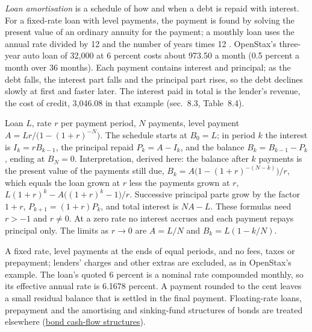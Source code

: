 \begin{qfmethod}\label{meth:loan-amortisation}
 \emph{Loan amortisation} is a schedule of how and when a debt is repaid with interest. For a fixed-rate loan with level payments, the payment is found by solving the present value of an ordinary annuity for the payment; a monthly loan uses the annual rate divided by 12 and the number of years times 12 \citep[sec.~8.3]{principles-of-finance-2026}. OpenStax's three-year auto loan of 32{,}000 at 6 percent costs about 973.50 a month (0.5 percent a month over 36 months). Each payment contains interest and principal; as the debt falls, the interest part falls and the principal part rises, so the debt declines slowly at first and faster later. The interest paid in total is the lender's revenue, the cost of credit, 3{,}046.08 in that example (sec.~8.3, Table~8.4).

 Loan $L$, rate $r$ per payment period, $N$ payments, level payment $A=Lr/\bigl(1-(1+r)^{-N}\bigr)$. The schedule starts at $B_0=L$; in period $k$ the interest is $I_k=rB_{k-1}$, the principal repaid $P_k=A-I_k$, and the balance $B_k=B_{k-1}-P_k$, ending at $B_N=0$. Interpretation, derived here: the balance after $k$ payments is the present value of the payments still due, $B_k=A\bigl(1-(1+r)^{-(N-k)}\bigr)/r$, which equals the loan grown at $r$ less the payments grown at $r$, $L(1+r)^k-A\bigl((1+r)^k-1\bigr)/r$. Successive principal parts grow by the factor $1+r$, $P_{k+1}=(1+r)P_k$, and total interest is $NA-L$. These formulas need $r>-1$ and $r\neq0$. At a zero rate no interest accrues and each payment repays principal only. The limits as $r\to0$ are $A=L/N$ and $B_k=L(1-k/N)$.

 A fixed rate, level payments at the ends of equal periods, and no fees, taxes or prepayment; lenders' charges and other extras are excluded, as in OpenStax's example. The loan's quoted 6 percent is a nominal rate compounded monthly, so its effective annual rate is 6.1678 percent. A payment rounded to the cent leaves a small residual balance that is settled in the final payment. Floating-rate loans, prepayment and the amortising and sinking-fund structures of bonds are treated elsewhere (\hyperref[def:bond-cash-flow-contingencies]{bond cash-flow structures}).


\end{qfmethod}
